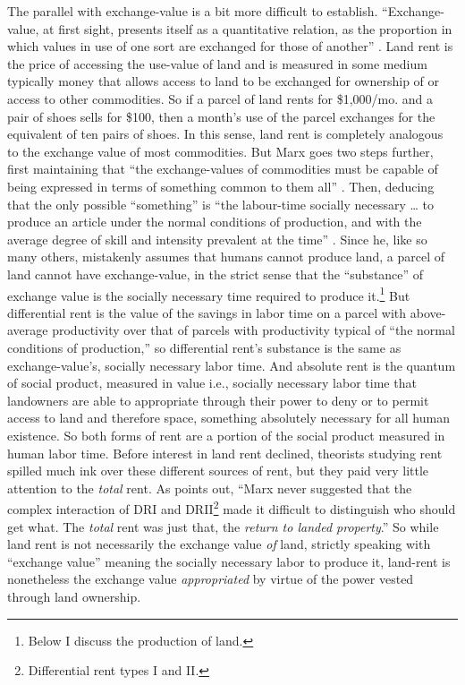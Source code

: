 The parallel with exchange-value is a bit more difficult to establish.
``Exchange-value, at first sight, presents itself as a quantitative
relation, as the proportion in which values in use of one sort are
exchanged for those of another'' \citep[36]{marx1967capital}. Land
rent is the price of accessing the use-value of land and is measured
in some medium \textendash{} typically money \textendash{} that allows
access to land to be exchanged for ownership of or access to other
commodities. So if a parcel of land rents for \$1,000/mo. and a pair
of shoes sells for \$100, then a month's use of the parcel exchanges
for the equivalent of ten pairs of shoes. In this sense, land rent
is completely analogous to the exchange value of most commodities.
But Marx goes two steps further, first maintaining that ``the exchange-values
of commodities must be capable of being expressed in terms of something
common to them all'' \citep[37]{marx1967capital}. Then, deducing
that the only possible ``something'' is ``the labour-time socially
necessary \ldots{} to produce an article under the normal conditions
of production, and with the average degree of skill and intensity
prevalent at the time'' \citep[39]{marx1967capital2}. Since he,
like so many others, mistakenly assumes that humans cannot produce
land, a parcel of land cannot have exchange-value, in the strict sense
that the ``substance'' of exchange value is the socially necessary
time required to produce it.\footnote{Below I discuss the production of land.}
But differential rent is the value of the savings in labor time on
a parcel with above-average productivity over that of parcels with
productivity typical of ``the normal conditions of production,''
so differential rent's substance is the same as exchange-value's,
socially necessary labor time. And absolute rent is the quantum of
social product, measured in value \textendash{} i.e., socially necessary
labor time \textendash{} that landowners are able to appropriate through
their power to deny or to permit access to land and therefore space,
something absolutely necessary for all human existence. So both forms
of rent are a portion of the social product measured in human labor
time. Before interest in land rent declined, theorists studying rent
spilled much ink over these different sources of rent, but they paid
very little attention to the \emph{total} rent. As \citet[74, emphasis in original]{kerr1996thetheory}
points out, ``Marx never suggested that the complex interaction of
DRI and DRII\footnote{Differential rent types I and II.} made it
difficult to distinguish who should get what. The \emph{total} rent
was just that, the \emph{return to landed property}.'' So while land
rent is not necessarily the exchange value \emph{of} land, strictly
speaking with ``exchange value'' meaning the socially necessary
labor to produce it, land-rent is nonetheless the exchange value \emph{appropriated}
by virtue of the power vested through land ownership.

